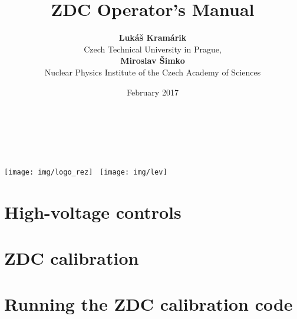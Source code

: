 \documentclass[a4paper,10pt]{report}
\title{ZDC Operator's Manual}
\author{\textbf{Lukáš Kramárik}\\
Czech Technical University in Prague,\\[.5cm] 
\textbf{Miroslav Šimko}\\[.4cm]
Nuclear Physics Institute of the Czech Academy of Sciences}
\date{February 2017}
\begin{document}
\makeatletter
\begin{titlepage}
\begin{center}
{\huge \bfseries  \@title }\\[2cm]
{\LARGE  \@author}\\[4ex] 
{\large \@date}\\[50ex]
\texttt{[image: img/logo\_rez]}\hspace*{3cm}~%
\texttt{[image: img/lev]}
\end{center}
\end{titlepage}
\makeatother
\thispagestyle{empty}
\newpage

\thispagestyle{empty}
\newpage

\tableofcontents


\chapter{High-voltage controls}


\chapter{ZDC calibration\label{calibration}}


\chapter{Running the ZDC calibration code\label{code}}



\end{document}
